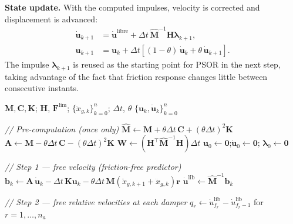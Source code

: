 \documentclass[preprint,12pt,authoryear]{elsarticle}
\begin{document}
\textbf{State update.}
With the computed impulses, velocity is corrected and displacement is advanced:
\begin{align}
    \dot{\bm{u}}_{k+1} &= \dot{\bm{u}}^{\mathrm{libre}}
        + \Delta t\,\hat{\bm{M}}^{-1}\bm{H}\bm{\lambda}_{k+1}, \label{eq:vupdate}\\
    \bm{u}_{k+1} &= \bm{u}_k
        + \Delta t\!\left[(1-\theta)\,\dot{\bm{u}}_k
                         + \theta\,\dot{\bm{u}}_{k+1}\right]. \label{eq:uupdate}
\end{align}
The impulse $\bm{\lambda}_{k+1}$ is reused as the starting point for PSOR in the next step, taking
advantage of the fact that friction response changes little between consecutive instants.

\begin{algorithm}[t]
\caption{NSD-LCP-PSOR applied to MDOF frames with RFD}
\label{alg:nsd-lcp-psor}
\begin{algorithmic}[1]
\Require $\bm{M},\bm{C},\bm{K}$; $\bm{H}$, $\bm{F}^{\lim}$;
         $\{\ddot{x}_{g,k}\}_{k=0}^{n}$; $\Delta t$, $\theta$
\Ensure  $\{\bm{u}_k,\dot{\bm{u}}_k\}_{k=0}^{n}$

\vspace{2pt}
\State \textit{// Pre-computation (once only)}
\State $\hat{\bm{M}} \leftarrow \bm{M} + \theta\Delta t\,\bm{C} + (\theta\Delta t)^{2}\bm{K}$
\State $\bm{A} \leftarrow \bm{M} - \theta\Delta t\,\bm{C} - (\theta\Delta t)^{2}\bm{K}$
\State $\bm{W} \leftarrow \left(\bm{H}^{\top}\hat{\bm{M}}^{-1}\bm{H}\right)\Delta t$
\State $\bm{u}_0 \leftarrow \bm{0}$;\quad $\dot{\bm{u}}_0 \leftarrow \bm{0}$;\quad
       $\bm{\lambda}_0 \leftarrow \bm{0}$

\vspace{2pt}
    \vspace{2pt}
    \State \textit{// Step 1 — free velocity (friction-free predictor)}
    \State $\bm{b}_k \leftarrow \bm{A}\,\dot{\bm{u}}_k
            - \Delta t\,\bm{K}\bm{u}_k
            - \theta\Delta t\,\bm{M}
              \!\left(\ddot{x}_{g,k+1}+\ddot{x}_{g,k}\right)\bm{r}$
    \State $\dot{\bm{u}}^{\mathrm{lib}} \leftarrow \hat{\bm{M}}^{-1}\bm{b}_k$

    \vspace{2pt}
    \State \textit{// Step 2 — free relative velocities at each damper}
    \State $q_r \leftarrow \dot{u}^{\mathrm{lib}}_{f_r} - \dot{u}^{\mathrm{lib}}_{f_r-1}$
           \quad for $r = 1,\ldots,n_a$


\end{algorithmic}
\end{algorithm}
\end{document}
